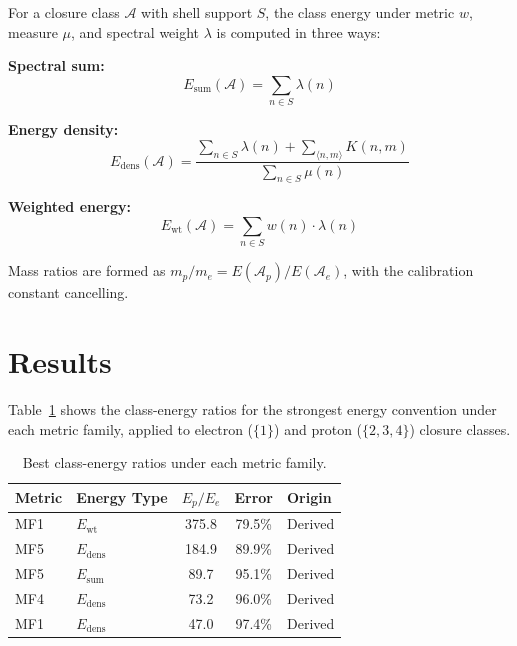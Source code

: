 \documentclass[12pt]{article}
\newcommand{\Acal}{\mathcal{A}}
\begin{document}
For a closure class $\Acal$ with shell support $S$, the class energy under metric $w$, measure $\mu$, and spectral weight $\lambda$ is computed in three ways:

\textbf{Spectral sum:}
\begin{equation}
    E_{\mathrm{sum}}(\Acal) = \sum_{n \in S} \lambda(n)
\end{equation}

\textbf{Energy density:}
\begin{equation}
    E_{\mathrm{dens}}(\Acal) = \frac{\sum_{n \in S} \lambda(n) + \sum_{\langle n,m \rangle} K(n,m)}{\sum_{n \in S} \mu(n)}
\end{equation}

\textbf{Weighted energy:}
\begin{equation}
    E_{\mathrm{wt}}(\Acal) = \sum_{n \in S} w(n) \cdot \lambda(n)
\end{equation}

Mass ratios are formed as $m_p / m_e = E(\Acal_p) / E(\Acal_e)$, with the calibration constant cancelling.

\section{Results}\label{sec:results}

Table~\ref{tab:results} shows the class-energy ratios for the strongest energy convention under each metric family, applied to electron ($\{1\}$) and proton ($\{2,3,4\}$) closure classes.

\begin{table}[ht]
\centering
\caption{Best class-energy ratios under each metric family.}
\label{tab:results}
\begin{tabular}{@{}llccl@{}}
\toprule
Metric & Energy Type & $E_p/E_e$ & Error & Origin \\
\midrule
MF1 & $E_{\mathrm{wt}}$ & 375.8 & 79.5\% & Derived \\
MF5 & $E_{\mathrm{dens}}$ & 184.9 & 89.9\% & Derived \\
MF5 & $E_{\mathrm{sum}}$ & 89.7 & 95.1\% & Derived \\
MF4 & $E_{\mathrm{dens}}$ & 73.2 & 96.0\% & Derived \\
MF1 & $E_{\mathrm{dens}}$ & 47.0 & 97.4\% & Derived \\
\bottomrule
\end{tabular}
\end{table}
\end{document}
